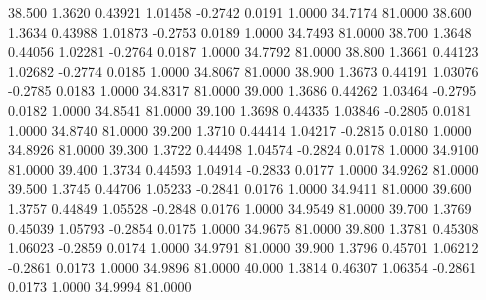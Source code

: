   38.500   1.3620   0.43921   1.01458  -0.2742   0.0191   1.0000  34.7174  81.0000
  38.600   1.3634   0.43988   1.01873  -0.2753   0.0189   1.0000  34.7493  81.0000
  38.700   1.3648   0.44056   1.02281  -0.2764   0.0187   1.0000  34.7792  81.0000
  38.800   1.3661   0.44123   1.02682  -0.2774   0.0185   1.0000  34.8067  81.0000
  38.900   1.3673   0.44191   1.03076  -0.2785   0.0183   1.0000  34.8317  81.0000
  39.000   1.3686   0.44262   1.03464  -0.2795   0.0182   1.0000  34.8541  81.0000
  39.100   1.3698   0.44335   1.03846  -0.2805   0.0181   1.0000  34.8740  81.0000
  39.200   1.3710   0.44414   1.04217  -0.2815   0.0180   1.0000  34.8926  81.0000
  39.300   1.3722   0.44498   1.04574  -0.2824   0.0178   1.0000  34.9100  81.0000
  39.400   1.3734   0.44593   1.04914  -0.2833   0.0177   1.0000  34.9262  81.0000
  39.500   1.3745   0.44706   1.05233  -0.2841   0.0176   1.0000  34.9411  81.0000
  39.600   1.3757   0.44849   1.05528  -0.2848   0.0176   1.0000  34.9549  81.0000
  39.700   1.3769   0.45039   1.05793  -0.2854   0.0175   1.0000  34.9675  81.0000
  39.800   1.3781   0.45308   1.06023  -0.2859   0.0174   1.0000  34.9791  81.0000
  39.900   1.3796   0.45701   1.06212  -0.2861   0.0173   1.0000  34.9896  81.0000
  40.000   1.3814   0.46307   1.06354  -0.2861   0.0173   1.0000  34.9994  81.0000
